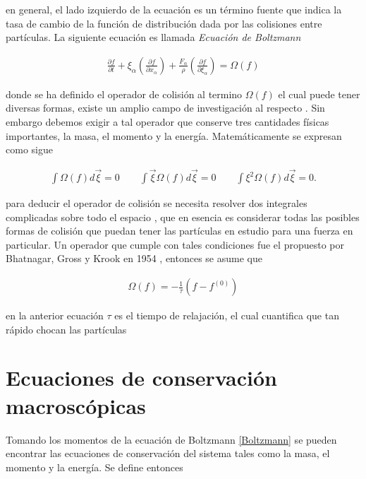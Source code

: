 \noindent en general, el lado izquierdo de la ecuación es un término fuente que indica la tasa de cambio de la función de distribución dada por las colisiones entre partículas.  La siguiente ecuación es llamada \emph{Ecuación de Boltzmann}

\begin{eqnarray}
\label{Boltzmann}
\frac{\partial f}{\partial t} + \xi_{\alpha}\left(\frac{\partial f}{\partial x_{\alpha}}\right)+\frac{F_{\alpha}}{\rho}\left(\frac{\partial f}{\partial \xi_{\alpha}}\right)=\Omega(f)
\end{eqnarray}

\noindent donde se ha definido el operador de colisión al termino $\Omega(f)$ el cual puede tener diversas formas, existe un amplio campo de investigación al respecto \cite{lecture3}\cite{lecture4}\cite{lecture5}. Sin embargo debemos exigir a tal operador que conserve tres cantidades físicas importantes, la masa, el momento y la energía. Matemáticamente se expresan como sigue 

\begin{eqnarray}
\int\Omega(f)d\vec{\xi} = 0 \qquad \int\vec{\xi}\Omega(f)d\vec{\xi} = 0 \qquad \int\xi^{2}\Omega(f)d\vec{\xi} = 0.
\end{eqnarray}

\noindent para deducir el operador de colisión se necesita resolver dos  integrales complicadas sobre todo el espacio \cite{lecture5}, que en esencia es considerar todas las posibles formas de colisión que puedan tener las partículas en estudio para una fuerza en particular. Un operador que cumple con tales condiciones fue el propuesto por Bhatnagar, Gross y Krook en 1954 \cite{BGK}, entonces se asume que 

\begin{eqnarray}
\Omega(f) = -\frac{1}{\tau}(f-f^{(0)})
\end{eqnarray}

\noindent en la anterior ecuación $\tau$ es el tiempo de relajación, el cual cuantifica que tan rápido chocan las partículas 

\section{Ecuaciones de conservación macroscópicas}

\noindent Tomando los momentos de la ecuación de Boltzmann \eqref{Boltzmann} se pueden encontrar las ecuaciones de conservación del sistema tales como la masa, el momento y la energía. Se define entonces

